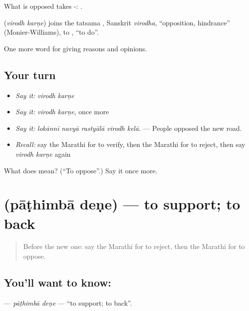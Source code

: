 What is opposed takes -:   .

\begin{cousinweb}
\textbf{ } (\emph{virodh karṇe}) joins the tatsama , Sanskrit \emph{virodha}, \textquotedblleft{}opposition, hindrance\textquotedblright{} (Monier-Williams), to , \textquotedblleft{}to do\textquotedblright{}.
\end{cousinweb}

\begin{grammarlens}[title={What you've built}]
One more word for giving reasons and opinions.
\end{grammarlens}

\subsection*{Your turn}
\begin{itemize}
\raggedright
  \item \emph{Say it:} \emph{virodh karṇe}
  \item \emph{Say it:} \emph{virodh karṇe}, once more
  \item \emph{Say it:} \emph{lokānnī navyā rastyālā virodh kelā.} — People opposed the new road.
  \item \emph{Recall:} say the Marathi for to verify, then the Marathi for to reject, then say \emph{virodh karṇe} again
\end{itemize}

\begin{tcolorbox}[breakable,colback=teal!4,colframe=teal!35!black,title={Before you move on}]
What does   mean? (\textquotedblleft{}To oppose\textquotedblright{}.) Say it once more.
\end{tcolorbox}
\section[\texorpdfstring{\mr{पाठिंबा} \mr{देणे} (pāṭhimbā deṇe)}{पाठिंबा देणे (pāṭhimbā deṇe)}]{  (pāṭhimbā deṇe) — to support; to back}

\label{lesson:MR-C347-pathimba-dene}



\begin{quote}
Before the new one: say the Marathi for to reject, then the Marathi for to oppose.
\end{quote}

\subsection*{You'll want to know:  }
\textbf{ } — \emph{pāṭhimbā deṇe} — \textquotedblleft{}to support; to back\textquotedblright{}.

